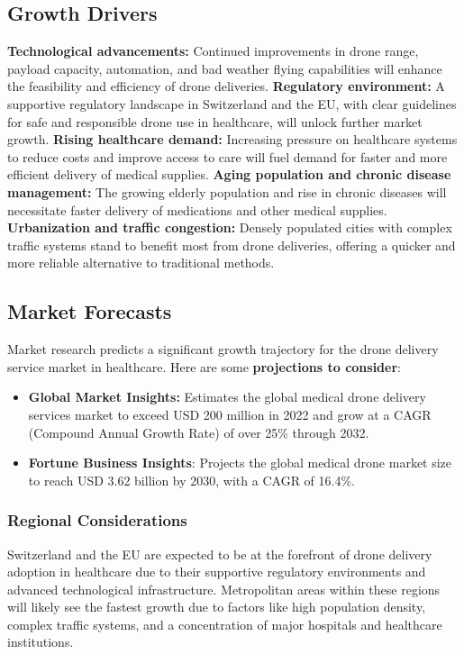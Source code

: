 \subsection{Growth Drivers}
\textbf{Technological advancements:} Continued improvements in drone range, payload capacity, automation, and bad weather flying capabilities will enhance the feasibility and efficiency of drone deliveries.
\newline
\textbf{Regulatory environment:} A supportive regulatory landscape in Switzerland and the EU, with clear guidelines for safe and responsible drone use in healthcare, will unlock further market growth.
\newline
\textbf{Rising healthcare demand:} Increasing pressure on healthcare systems to reduce costs and improve access to care will fuel demand for faster and more efficient delivery of medical supplies.
\newline
\textbf{Aging population and chronic disease management:} The growing elderly population and rise in chronic diseases will necessitate faster delivery of medications and other medical supplies.
\newline
\textbf{Urbanization and traffic congestion:} Densely populated cities with complex traffic systems stand to benefit most from drone deliveries, offering a quicker and more reliable alternative to traditional methods.
\subsection{Market Forecasts}
Market research predicts a significant growth trajectory for the drone delivery service market in healthcare. Here are some \textbf{projections to consider}:
\begin{itemize}
  \item \textbf{Global Market Insights:} Estimates the global medical drone delivery services market to exceed USD 200 million in 2022 and grow at a CAGR (Compound Annual Growth Rate) of over 25\% through 2032.
  \item \textbf{Fortune Business Insights}: Projects the global medical drone market size to reach USD 3.62 billion by 2030, with a CAGR of 16.4\%.
\end{itemize}
\subsubsection{Regional Considerations}
Switzerland and the EU are expected to be at the forefront of drone delivery adoption in healthcare due to their supportive regulatory environments and advanced technological infrastructure.
\newline
\newline
Metropolitan areas within these regions will likely see the fastest growth due to factors like high population density, complex traffic systems, and a concentration of major hospitals and healthcare institutions.
